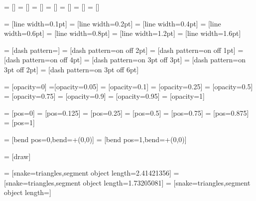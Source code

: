 =           []
=              []
=             []
=              []
=              []
=             []
=        []

=              [line width=0.1pt]
=               [line width=0.2pt]
=                    [line width=0.4pt]
=               [line width=0.6pt]
=                   [line width=0.8pt]
=              [line width=1.2pt]
=             [line width=1.6pt]

=                   [dash pattern=]
=                  [dash pattern=on \pgflinewidth off 2pt]
=          [dash pattern=on \pgflinewidth off 1pt]
=          [dash pattern=on \pgflinewidth off 4pt]
=                  [dash pattern=on 3pt off 3pt]
=          [dash pattern=on 3pt off 2pt]
=          [dash pattern=on 3pt off 6pt]

=             [opacity=0]
=[opacity=0.05]
= [opacity=0.1]
=      [opacity=0.25]
=         [opacity=0.5]
=           [opacity=0.75]
=      [opacity=0.9]
=     [opacity=0.95]
=                  [opacity=1]

=                [pos=0]
=         [pos=0.125]
=              [pos=0.25]
=                  [pos=0.5]
=                [pos=0.75]
=           [pos=0.875]
=                  [pos=1]

=           [bend pos=0,bend={+(0,0)}]
=             [bend pos=1,bend={+(0,0)}]

=        [draw]

=      [snake=triangles,segment object length=2.41421356\pgfsnakesegmentamplitude]
=      [snake=triangles,segment object length=1.73205081\pgfsnakesegmentamplitude]
=      [snake=triangles,segment object length=\pgfsnakesegmentamplitude]


